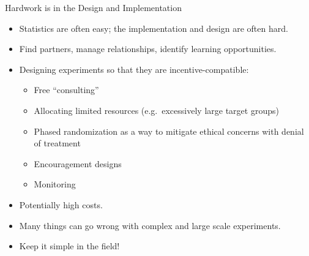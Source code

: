 \documentclass{beamer}
\numberwithin{equation}{section}
\begin{document}
\begin{frame}{Hardwork is in the Design and Implementation}

\begin{itemize}
\itemsep1pt\parskip0pt
\item
  Statistics are often easy; the implementation and design are often hard.
\item
  Find partners, manage relationships, identify learning
  opportunities.
\item
  Designing experiments so that they are incentive-compatible:

  \begin{itemize}
  \itemsep1pt\parskip0pt
  \item
    Free ``consulting''
  \item
    Allocating limited resources (e.g.~excessively large target groups)
  \item
    Phased randomization as a way to mitigate ethical concerns with
    denial of treatment
  \item
    Encouragement designs
  \item
    Monitoring
  \end{itemize}
\item
  Potentially high costs.
\item
  Many things can go wrong with complex and large scale experiments. %
  \item Keep it simple in the field!
\end{itemize}

\end{frame}

\end{document}
